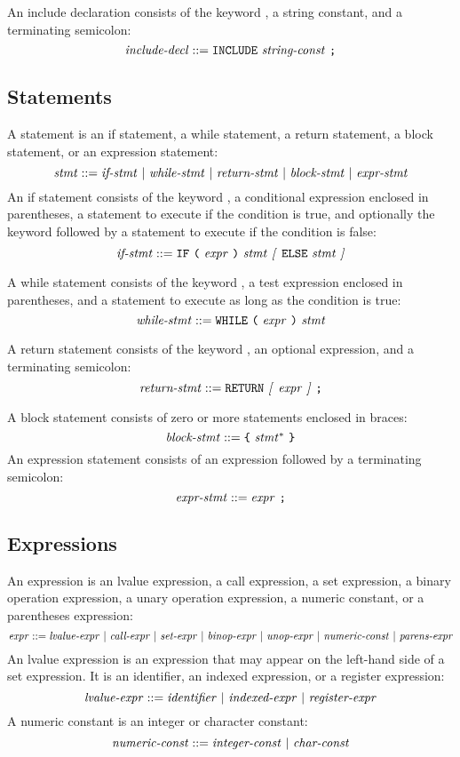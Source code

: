 \documentclass[10pt]{article}
\begin{document}
 An include declaration consists of the
keyword , a string constant, and a terminating semicolon:
%
$$\mbox{\textit{include-decl}} ::= \mbox{\texttt{INCLUDE}
  \ensuremath{\mbox{\textit{string-const}}} \texttt{;}}$$
%

\subsection{Statements}
\label{sec:syntax:statements}

A statement is an if statement, a while statement, a return statement,
a block statement, or an expression statement:
%
$$\mbox{\textit{stmt}} ::= \mbox{\ensuremath{\mbox{\textit{if-stmt}}} $|$ \ensuremath{\mbox{\textit{while-stmt}}}
  $|$ \ensuremath{\mbox{\textit{return-stmt}}} $|$ \ensuremath{\mbox{\textit{block-stmt}}} $|$
  \ensuremath{\mbox{\textit{expr-stmt}}}}$$
%
 An if statement consists of the keyword
, a conditional expression enclosed in parentheses, a
statement to execute if the condition is true, and optionally the
keyword  followed by a statement to execute if the condition
is false:
%
$$\mbox{\textit{if-stmt}} ::= \mbox{\texttt{IF} \texttt{(} \ensuremath{\mbox{\textit{expr}}} \texttt{)}
  \ensuremath{\mbox{\textit{stmt}}} \textit{[} \texttt{ELSE} \ensuremath{\mbox{\textit{stmt}}} \textit{]}}$$
%

 A while statement consists of the keyword
, a test expression enclosed in parentheses, and a
statement to execute as long as the condition is true:
%
$$\mbox{\textit{while-stmt}} ::= \mbox{\texttt{WHILE} \texttt{(} \ensuremath{\mbox{\textit{expr}}}
  \texttt{)} \ensuremath{\mbox{\textit{stmt}}}}$$
%

 A return statement consists of the keyword
, an optional expression, and a terminating semicolon:
%
$$\mbox{\textit{return-stmt}} ::= \mbox{\texttt{RETURN} \textit{[} \ensuremath{\mbox{\textit{expr}}} \textit{]}
    \texttt{;}}$$
%

 A block statement consists of zero or more
statements enclosed in braces:
%
$$\mbox{\textit{block-stmt}} ::= \mbox{\texttt{\{} \ensuremath{\mbox{\textit{stmt}}}$^*$
  \texttt{\}}}$$
%
 An expression statement consists of an
expression followed by a terminating semicolon:
%
$$\mbox{\textit{expr-stmt}} ::= \mbox{\ensuremath{\mbox{\textit{expr}}} \texttt{;}}$$
%

\subsection{Expressions}
\label{sec:syntax:expressions}

An expression is an lvalue expression, a call expression, a set
expression, a binary operation expression, a unary operation
expression, a numeric constant, or a parentheses expression:
%
$$\mbox{\textit{expr}} ::= \mbox{\ensuremath{\mbox{\textit{lvalue-expr}}} $|$
  \ensuremath{\mbox{\textit{call-expr}}} $|$ \ensuremath{\mbox{\textit{set-expr}}} $|$ \ensuremath{\mbox{\textit{binop-expr}}}
  $|$ \ensuremath{\mbox{\textit{unop-expr}}} $|$ \ensuremath{\mbox{\textit{numeric-const}}} $|$
  \ensuremath{\mbox{\textit{parens-expr}}}}$$
%
An lvalue expression is an expression that may appear on the left-hand
side of a set expression.  It is an identifier, an indexed expression,
or a register expression:
%
$$\mbox{\textit{lvalue-expr}} ::= \mbox{\ensuremath{\mbox{\textit{identifier}}} $|$
  \ensuremath{\mbox{\textit{indexed-expr}}} $|$ \ensuremath{\mbox{\textit{register-expr}}}}$$
%
A numeric constant is an integer or character constant:
%
$$\mbox{\textit{numeric-const}} ::= \mbox{\ensuremath{\mbox{\textit{integer-const}}} $|$
  \ensuremath{\mbox{\textit{char-const}}}}$$
%
\end{document}
